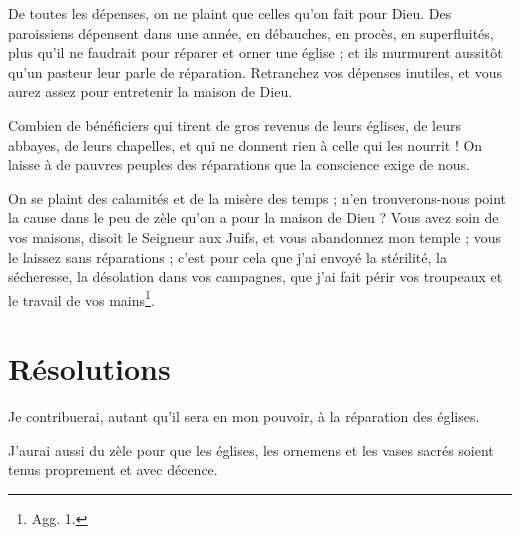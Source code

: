 \documentclass[instructions.tex]{subfiles}
\begin{document}
De toutes les dépenses, on ne plaint que celles qu’on fait pour Dieu. Des paroissiens dépensent dans une année, en débauches, en procès, en superfluités, plus qu’il ne faudrait pour réparer et orner une église ; et ils murmurent aussitôt qu’un pasteur leur parle de réparation. Retranchez vos dépenses inutiles, et vous aurez assez pour entretenir la maison de Dieu.
 
Combien de bénéficiers qui tirent de gros revenus de leurs églises, de leurs abbayes, de leurs chapelles, et qui ne donnent rien à celle qui les nourrit ! On laisse à de pauvres peuples des réparations que la conscience exige de nous.
 
On se plaint des calamités et de la misère des temps ; n’en trouverons-nous point la cause dans le peu de zèle qu’on a pour la maison de Dieu ? Vous avez soin de vos maisons, disoit le Seigneur aux Juifs, et vous abandonnez mon temple ; vous le laissez sans réparations ; c’est pour cela que j’ai envoyé la stérilité, la sécheresse, la désolation dans vos campagnes, que j’ai fait périr vos troupeaux et le travail de vos mains\footnote{ Agg. 1.}.
 
\section{Résolutions}
 
\primo Je contribuerai, autant qu’il sera en mon pouvoir, à la réparation des églises.
 
\secundo J’aurai aussi du zèle pour que les églises, les ornemens et les vases sacrés soient tenus proprement et avec décence.
 
\end{document}
